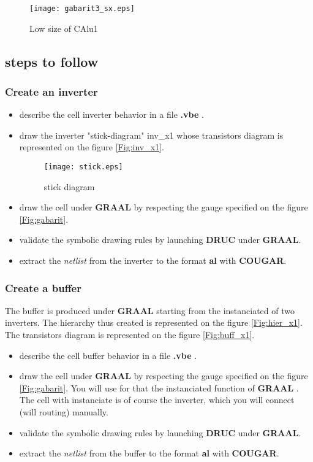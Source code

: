 \documentclass{article}
\begin{document}
\begin{figure}[H]\centering
  \texttt{[image: gabarit3\_sx.eps]}
  \caption{Low size of CAlu1}
  \label{Fig:gabarit3}
\end{figure}

\subsection{steps to follow}

\subsubsection{Create an inverter}

\begin{itemize}\itemsep=-.4ex
\item   describe the cell inverter behavior in a file { \bf .vbe } .
\item   draw the inverter "stick-diagram" inv\_x1 whose transistors diagram
        is represented on the figure \ref{Fig:inv_x1}.

\begin{figure}[H]\centering
  \texttt{[image: stick.eps]}
  \caption{stick diagram}
  \label{Fig:stick}
\end{figure}

\item   draw the cell under {\bf GRAAL} by respecting the
        gauge specified on the figure \ref{Fig:gabarit}.
\item   validate the symbolic drawing rules by launching {\bf DRUC} under {\bf GRAAL}.
\item   extract the { \it netlist } \/from the inverter to the format {\bf al} with {\bf COUGAR}.
\end{itemize}

\subsubsection{Create a buffer}

The buffer is produced under { \bf GRAAL } starting from the
instanciated of two inverters. The hierarchy thus created is
represented on the figure \ref{Fig:hier_x1}. The transistors
diagram is represented on the figure \ref{Fig:buff_x1}.

\begin{itemize}\itemsep=-.4ex
\item   describe the cell buffer behavior in a file { \bf .vbe }.
\item   draw the cell under {\bf GRAAL} by respecting the
        gauge specified on the figure \ref{Fig:gabarit}.
        You will use for that the instanciated function of { \bf GRAAL }.
        The cell with instanciate is of course the inverter, which you will connect (will routing) manually.
\item   validate the symbolic drawing rules by launching {\bf DRUC} under {\bf GRAAL}.
\item   extract the { \it netlist } \/from the buffer to the format {\bf al} with {\bf COUGAR}.
\end{itemize}
\end{document}
